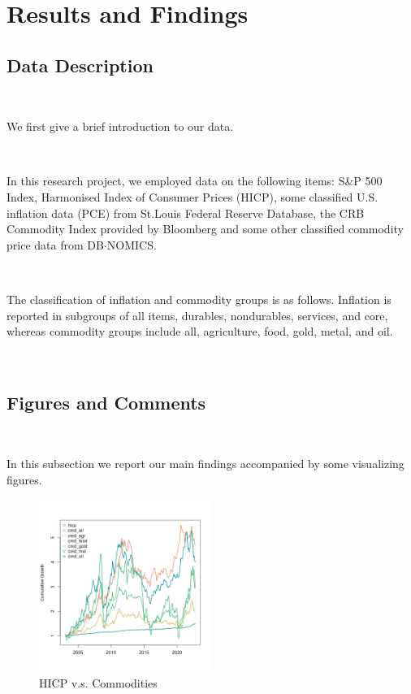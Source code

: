 \documentclass{article}
\begin{document}


\section{Results and Findings}

\subsection{Data Description}

\


We first give a brief introduction to our data. 

\

In this research project, we employed data on the following items:  S\&P 500 Index, Harmonised Index of Consumer Prices (HICP), some classified U.S. inflation data (PCE) from St.Louis Federal Reserve Database, the CRB Commodity Index provided by Bloomberg and some other classified commodity price data from DB$\cdot$NOMICS.

\

The classification of inflation and commodity groups is as follows. Inflation is reported in subgroups of all items, durables, nondurables, services, and core, whereas commodity groups include all, agriculture, food, gold, metal, and oil.

\


\subsection{Figures and Comments}

\

In this subsection we report our main findings accompanied by some visualizing figures.


\begin{figure}[h!]
    \centering
    \includegraphics[width=0.5\textwidth]{../../figures/cumgrowth.png}
    \caption{HICP v.s. Commodities}
    \label{fig:cumgrowth}
\end{figure}
\end{document}
